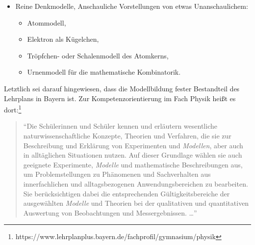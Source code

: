 \begin{enumerate}
\begin{itemize}
\item
Reine Denkmodelle,
Anschauliche Vorstellungen von etwas Unanschaulichem:
\begin{itemize}
\item Atommodell,
\item Elektron als K\"{u}gelchen,
\item Tr\"{o}pfchen- oder Schalenmodell des Atomkerns,
\item Urnenmodell f\"{u}r die mathematische Kombinatorik.
\end{itemize}

\end{itemize}
\end{enumerate}

\mip
Letztlich sei darauf hingewiesen, dass die Modellbildung fester Bestandteil des Lehrplans in Bayern ist. Zur Kompetenzorientierung im Fach Physik hei{\ss}t es dort:\footnote{https://www.lehrplanplus.bayern.de/fachprofil/gymnasium/physik}

\begin{quote} ``Die Sch\"{u}lerinnen und Sch\"{u}ler kennen und erl\"{a}utern wesentliche naturwissenschaftliche Konzepte, Theorien und Verfahren, die sie zur Beschreibung und Erkl\"{a}rung von Experimenten und \emph{Modellen}, aber auch in allt\"{a}glichen Situationen nutzen. Auf dieser Grundlage w\"{a}hlen sie auch geeignete Experimente, \emph{Modelle} und mathematische Beschreibungen aus, um Problemstellungen zu Ph\"{a}nomenen und Sachverhalten aus innerfachlichen und alltagsbezogenen Anwendungsbereichen zu bearbeiten. Sie ber\"{u}cksichtigen dabei die entsprechenden G\"{u}ltigkeitsbereiche der ausgew\"{a}hlten \emph{Modelle} und Theorien bei der qualitativen und quantitativen Auswertung von Beobachtungen und Messergebnissen. \dots ''
\end{quote}


